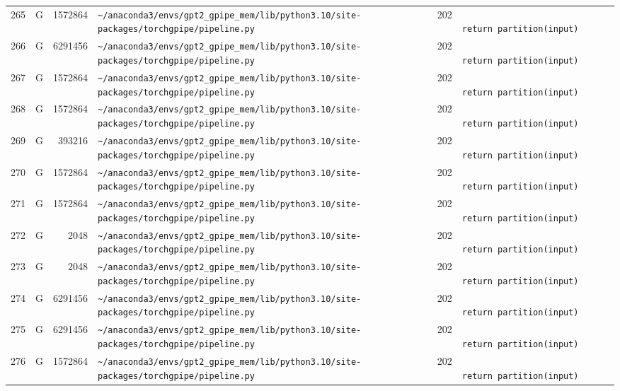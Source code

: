 \documentclass{article}
\begin{document}
\begin{longtable}{r l r p{6.5cm} r p{7.0cm}}
265 & G & 1572864 & \lstinline|~/anaconda3/envs/gpt2_gpipe_mem/lib/python3.10/site-packages/torchgpipe/pipeline.py| & 202 & \lstinline|                        return partition(input)| \\
266 & G & 6291456 & \lstinline|~/anaconda3/envs/gpt2_gpipe_mem/lib/python3.10/site-packages/torchgpipe/pipeline.py| & 202 & \lstinline|                        return partition(input)| \\
267 & G & 1572864 & \lstinline|~/anaconda3/envs/gpt2_gpipe_mem/lib/python3.10/site-packages/torchgpipe/pipeline.py| & 202 & \lstinline|                        return partition(input)| \\
268 & G & 1572864 & \lstinline|~/anaconda3/envs/gpt2_gpipe_mem/lib/python3.10/site-packages/torchgpipe/pipeline.py| & 202 & \lstinline|                        return partition(input)| \\
269 & G & 393216 & \lstinline|~/anaconda3/envs/gpt2_gpipe_mem/lib/python3.10/site-packages/torchgpipe/pipeline.py| & 202 & \lstinline|                        return partition(input)| \\
270 & G & 1572864 & \lstinline|~/anaconda3/envs/gpt2_gpipe_mem/lib/python3.10/site-packages/torchgpipe/pipeline.py| & 202 & \lstinline|                        return partition(input)| \\
271 & G & 1572864 & \lstinline|~/anaconda3/envs/gpt2_gpipe_mem/lib/python3.10/site-packages/torchgpipe/pipeline.py| & 202 & \lstinline|                        return partition(input)| \\
272 & G & 2048 & \lstinline|~/anaconda3/envs/gpt2_gpipe_mem/lib/python3.10/site-packages/torchgpipe/pipeline.py| & 202 & \lstinline|                        return partition(input)| \\
273 & G & 2048 & \lstinline|~/anaconda3/envs/gpt2_gpipe_mem/lib/python3.10/site-packages/torchgpipe/pipeline.py| & 202 & \lstinline|                        return partition(input)| \\
274 & G & 6291456 & \lstinline|~/anaconda3/envs/gpt2_gpipe_mem/lib/python3.10/site-packages/torchgpipe/pipeline.py| & 202 & \lstinline|                        return partition(input)| \\
275 & G & 6291456 & \lstinline|~/anaconda3/envs/gpt2_gpipe_mem/lib/python3.10/site-packages/torchgpipe/pipeline.py| & 202 & \lstinline|                        return partition(input)| \\
276 & G & 1572864 & \lstinline|~/anaconda3/envs/gpt2_gpipe_mem/lib/python3.10/site-packages/torchgpipe/pipeline.py| & 202 & \lstinline|                        return partition(input)| \\

\end{longtable}
\end{document}
